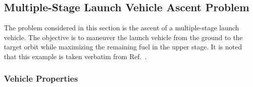 \documentclass[10pt]{article}
\begin{document}
\begin{figure}[t]
\end{figure}

\clearpage

\subsection{Multiple-Stage Launch Vehicle Ascent Problem}

The problem considered in this section is the ascent of a
multiple-stage launch vehicle.  The objective is to maneuver the launch
vehicle from the ground to the target orbit while maximizing the remaining
fuel in the upper stage.   It is noted that this example is taken
verbatim from Ref.~.

\subsubsection{Vehicle Properties}
\end{document}
